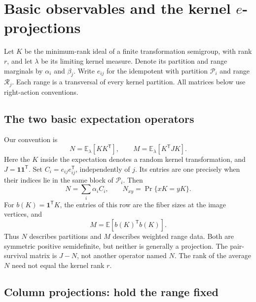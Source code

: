 \section{Basic observables and the kernel $e$-projections}
\label{eproj:section}

Let $K$ be the minimum-rank ideal of a finite transformation semigroup,
with rank $r$, and let $\lambda$ be its limiting kernel measure. Denote
its partition and range marginals by $\alpha_i$ and $\beta_j$. Write
$e_{ij}$ for the idempotent with partition $\mathcal P_i$ and range
$\mathcal R_j$. Each range is a transversal of every kernel partition.
All matrices below use right-action conventions.

\subsection{The two basic expectation operators}
\label{notation:expectations}

Our convention is
\[
 \boxed{N=\mathbb E_\lambda[KK^{\mathsf T}],\qquad
 M=\mathbb E_\lambda[K^{\mathsf T}JK].}
\]
Here the $K$ inside the expectation denotes a random kernel transformation,
and $J=\mathbf1\mathbf1^{\mathsf T}$.
Set $C_i=e_{ij}e_{ij}^{\mathsf T}$, independently of $j$. Its entries are
one precisely when their indices lie in the same block of $\mathcal P_i$.
Then
\[
 N=\sum_i\alpha_i C_i,\qquad N_{xy}=\Pr\{xK=yK\}.
\]
For $b(K)=\mathbf1^{\mathsf T}K$, the entries of this row are the fiber
sizes at the image vertices, and
\[
 M=\mathbb E[b(K)^{\mathsf T}b(K)].
\]
Thus $N$ describes partitions and $M$ describes weighted range data.
Both are symmetric positive semidefinite, but neither is generally a
projection. The pair-survival matrix is $J-N$, not another operator
named $N$. The rank of the average $N$ need not equal the kernel rank $r$.

\subsection{Column projections: hold the range fixed}
\label{notation:range-projections}

